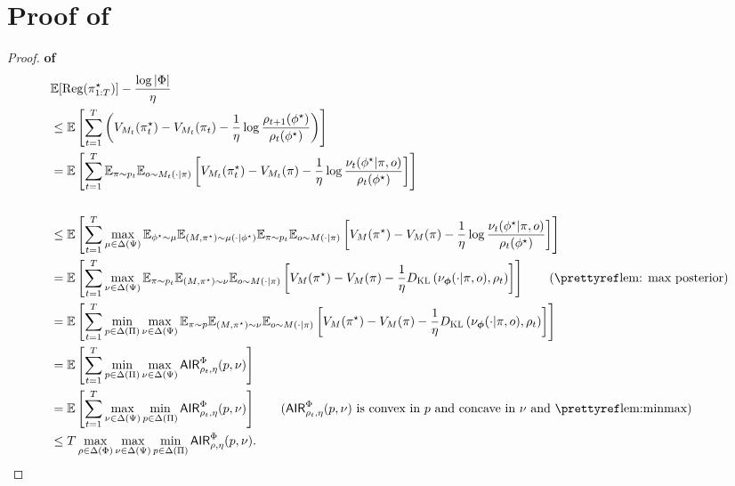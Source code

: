 \section{Proof of }
\begin{proof}\textbf{of }
    \begin{align*}
       &\E[\Reg(\pi_{1:T}^\star)] - \frac{\log|\Phi|}{\eta} \\
       &\leq \E\left[\sum_{t=1}^T \left(V_{M_t}(\pi_t^\star) -  V_{M_t}(\pi_t) - \frac{1}{\eta}\log\frac{\rho_{t+1}(\phi^\star)}{\rho_t(\phi^\star)} \right)\right] \\
       &= \E\left[\sum_{t=1}^T  \E_{\pi\sim p_t} \E_{o\sim M_t(\cdot|\pi)}\left[ V_{M_t}(\pi_t^\star) -  V_{M_t}(\pi) - \frac{1}{\eta} \log\frac{\nu_t(\phi^\star|\pi, o)}{\rho_t(\phi^\star)} \right]\right] \\
       \\&\leq \E\left[\sum_{t=1}^T  \max_{\mu \in \Delta(\Psi)}\E_{\phi^\star \sim \mu}\E_{(M, \pi^\star) \sim \mu(\cdot|\phi^\star)}\E_{\pi\sim p_t} \E_{o\sim M(\cdot|\pi)}\left[ V_{M}(\pi^\star) -  V_{M}(\pi) - \frac{1}{\eta} \log\frac{\nu_t(\phi^\star|\pi, o)}{\rho_t(\phi^\star)} \right]\right]
       \\&= \E\left[ \sum_{t=1}^T  \max_{\nu \in \Delta(\Psi)}\E_{\pi\sim p_t} \E_{(M,\pi^\star)\sim \nu} \E_{o\sim M(\cdot|\pi)}\left[ V_{M}(\pi^\star) -  V_{M}(\pi) - \frac{1}{\eta} \KL\left( \nu_{\bo{\phi}}(\cdot|\pi, o), \rho_t\right) \right]\right]  \tag{\pref{lem: max posterior}}   \\
       &= \E\left[ \sum_{t=1}^T  \min_{p\in\Delta(\Pi)}\max_{\nu\in\Delta(\joint)} \E_{\pi\sim p} \E_{(M,\pi^\star)\sim \nu} \E_{o\sim M(\cdot|\pi)}\left[ V_{M}(\pi^\star) -  V_{M}(\pi) - \frac{1}{\eta} \KL\left( \nu_{\bo{\phi}}(\cdot|\pi, o), \rho_t\right) \right]\right] \\
       &= \E\left[ \sum_{t=1}^T  \min_{p\in\Delta(\Pi)}\max_{\nu\in\Delta(\joint)}  
\air^\Phi_{\rho_t,\eta}(p,\nu) \right] \\
       &= \E\left[ \sum_{t=1}^T  \max_{\nu\in\Delta(\joint)}\min_{p\in\Delta(\Pi)}  
\air^\Phi_{\rho_t,\eta}(p,\nu) \right]   \tag{$\air^\Phi_{\rho_t,\eta}(p,\nu)$ is convex in $p$ and concave in $\nu$ and \pref{lem:minmax}}  \\
    &\leq  T \max_{\rho \in \Delta(\Phi)}\max_{\nu\in\Delta(\joint)}\min_{p\in\Delta(\Pi)}  
\air^\Phi_{\rho,\eta}(p,\nu). 
    \end{align*}
\end{proof}

